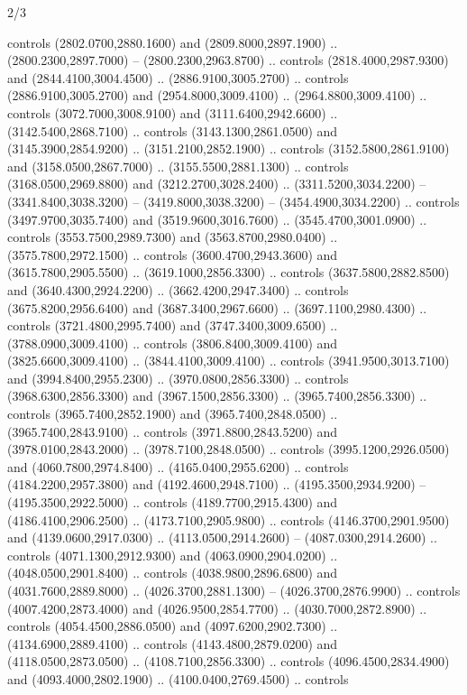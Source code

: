 \begin{flagdescription}{2/3}
\begin{scope}[shift={(0.5\flaglength,0.5)},scale=\flagwidth/130]
\begin{scope}[y=0.01mm, x=0.01mm,shift={(-3365,-2250)}]
  controls (2802.0700,2880.1600) and (2809.8000,2897.1900) ..
  (2800.2300,2897.7000) -- (2800.2300,2963.8700) .. controls
  (2818.4000,2987.9300) and (2844.4100,3004.4500) .. (2886.9100,3005.2700) ..
  controls (2886.9100,3005.2700) and (2954.8000,3009.4100) ..
  (2964.8800,3009.4100) .. controls (3072.7000,3008.9100) and
  (3111.6400,2942.6600) .. (3142.5400,2868.7100) .. controls
  (3143.1300,2861.0500) and (3145.3900,2854.9200) .. (3151.2100,2852.1900) ..
  controls (3152.5800,2861.9100) and (3158.0500,2867.7000) ..
  (3155.5500,2881.1300) .. controls (3168.0500,2969.8800) and
  (3212.2700,3028.2400) .. (3311.5200,3034.2200) -- (3341.8400,3038.3200) --
  (3419.8000,3038.3200) -- (3454.4900,3034.2200) .. controls
  (3497.9700,3035.7400) and (3519.9600,3016.7600) .. (3545.4700,3001.0900) ..
  controls (3553.7500,2989.7300) and (3563.8700,2980.0400) ..
  (3575.7800,2972.1500) .. controls (3600.4700,2943.3600) and
  (3615.7800,2905.5500) .. (3619.1000,2856.3300) .. controls
  (3637.5800,2882.8500) and (3640.4300,2924.2200) .. (3662.4200,2947.3400) ..
  controls (3675.8200,2956.6400) and (3687.3400,2967.6600) ..
  (3697.1100,2980.4300) .. controls (3721.4800,2995.7400) and
  (3747.3400,3009.6500) .. (3788.0900,3009.4100) .. controls
  (3806.8400,3009.4100) and (3825.6600,3009.4100) .. (3844.4100,3009.4100) ..
  controls (3941.9500,3013.7100) and (3994.8400,2955.2300) ..
  (3970.0800,2856.3300) .. controls (3968.6300,2856.3300) and
  (3967.1500,2856.3300) .. (3965.7400,2856.3300) .. controls
  (3965.7400,2852.1900) and (3965.7400,2848.0500) .. (3965.7400,2843.9100) ..
  controls (3971.8800,2843.5200) and (3978.0100,2843.2000) ..
  (3978.7100,2848.0500) .. controls (3995.1200,2926.0500) and
  (4060.7800,2974.8400) .. (4165.0400,2955.6200) .. controls
  (4184.2200,2957.3800) and (4192.4600,2948.7100) .. (4195.3500,2934.9200) --
  (4195.3500,2922.5000) .. controls (4189.7700,2915.4300) and
  (4186.4100,2906.2500) .. (4173.7100,2905.9800) .. controls
  (4146.3700,2901.9500) and (4139.0600,2917.0300) .. (4113.0500,2914.2600) --
  (4087.0300,2914.2600) .. controls (4071.1300,2912.9300) and
  (4063.0900,2904.0200) .. (4048.0500,2901.8400) .. controls
  (4038.9800,2896.6800) and (4031.7600,2889.8000) .. (4026.3700,2881.1300) --
  (4026.3700,2876.9900) .. controls (4007.4200,2873.4000) and
  (4026.9500,2854.7700) .. (4030.7000,2872.8900) .. controls
  (4054.4500,2886.0500) and (4097.6200,2902.7300) .. (4134.6900,2889.4100) ..
  controls (4143.4800,2879.0200) and (4118.0500,2873.0500) ..
  (4108.7100,2856.3300) .. controls (4096.4500,2834.4900) and
  (4093.4000,2802.1900) .. (4100.0400,2769.4500) .. controls

\end{scope}
\end{scope}
\end{flagdescription}
